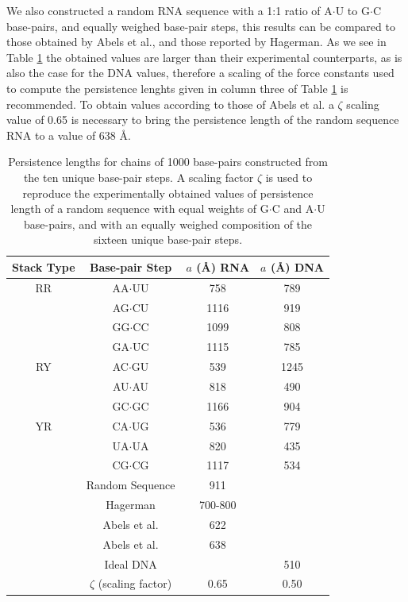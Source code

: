 We also constructed a random RNA sequence with a 1:1 ratio of A$\cdot$U
to G$\cdot$C base-pairs, and equally weighed base-pair steps, this
results can be compared to those obtained by Abels et al., and those
reported by Hagerman. As we see in Table \ref{tab:compare}  the
obtained values are larger than their experimental counterparts, as is
also the case for the DNA values, therefore a scaling of the force
constants used to compute the persistence lenghts given in column
three of Table \ref{tab:compare} is recommended. To obtain values
according to those of Abels et al. a $\zeta$ scaling value of 0.65 is
necessary to bring the persistence length of the random sequence RNA
to a value of 638 \AA.

\begin{table}  
\begin{center}
\begin{tabular}{|c|c|c|c|}
\hline
Stack Type & Base-pair Step & $a$ (\AA) RNA & $a$ (\AA) DNA\\
\hline \hline
RR &  AA$\cdot$UU & 758      &  789   \\
   &  AG$\cdot$CU & 1116     &  919   \\
   &  GG$\cdot$CC & 1099     &  808   \\
   &  GA$\cdot$UC & 1115     &  785   \\
\hline
RY &  AC$\cdot$GU & 539      &  1245   \\
   &  AU$\cdot$AU & 818      &  490   \\
   &  GC$\cdot$GC & 1166     &  904   \\
\hline
YR &  CA$\cdot$UG & 536      &  779   \\
   &  UA$\cdot$UA & 820      &  435   \\
   &  CG$\cdot$CG & 1117     &  534   \\
\hline
   & Random Sequence  & 911   &        \\
   & Hagerman   & 700-800    &        \\
   & Abels et al.   & 622    &        \\ 
   & Abels et al.   & 638    &        \\
   & Ideal DNA    &          & 510    \\
   & $\zeta$ (scaling factor)  & 0.65 & 0.50 \\
\hline
\end{tabular}
\caption{Persistence lengths for chains of 1000 base-pairs constructed
  from the ten unique base-pair steps. A scaling factor $\zeta$ is used to
  reproduce the experimentally obtained values of persistence length
  of a random sequence with equal weights of G$\cdot$C and A$\cdot$U
  base-pairs, and with an equally weighed composition of the sixteen
  unique base-pair steps.}
\label{tab:compare}
\end{center}
\end{table}

